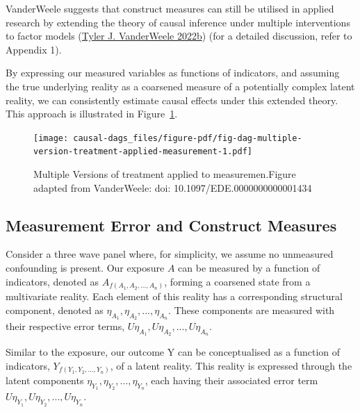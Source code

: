 \documentclass[
  singlecolumn]{report}
\begin{document}
VanderWeele suggests that construct measures can still be utilised in
applied research by extending the theory of causal inference under
multiple interventions to factor models
(\protect\hyperlink{ref-vanderweele2022a}{Tyler J. VanderWeele 2022b})
(for a detailed discussion, refer to Appendix 1).

By expressing our measured variables as functions of indicators, and
assuming the true underlying reality as a coarsened measure of a
potentially complex latent reality, we can consistently estimate causal
effects under this extended theory. This approach is illustrated in
Figure~\ref{fig-dag-multiple-version-treatment-applied-measurement}.

\begin{figure}

{\centering \texttt{[image: causal-dags\_files/figure-pdf/fig-dag-multiple-version-treatment-applied-measurement-1.pdf]}

}

\caption{\label{fig-dag-multiple-version-treatment-applied-measurement}Multiple
Versions of treatment applied to measuremen.Figure adapted from
VanderWeele: doi: 10.1097/EDE.0000000000001434}

\end{figure}

\hypertarget{measurement-error-and-construct-measures}{%
\subsection{Measurement Error and Construct
Measures}\label{measurement-error-and-construct-measures}}

Consider a three wave panel where, for simplicity, we assume no
unmeasured confounding is present. Our exposure \(A\) can be measured by
a function of indicators, denoted as \(A_{f(A_1, A_2, ..., A_n)}\),
forming a coarsened state from a multivariate reality. Each element of
this reality has a corresponding structural component, denoted as
\(\eta_{A_1}, \eta_{A_2}, ..., \eta_{A_n}\). These components are
measured with their respective error terms,
\(U\eta_{A_1}, U\eta_{A_2}, ..., U\eta_{A_n}\).

Similar to the exposure, our outcome Y can be conceptualised as a
function of indicators, \(Y_{f(Y_1, Y_2, ..., Y_n)}\), of a latent
reality. This reality is expressed through the latent components
\(\eta_{Y_1}, \eta_{Y_2}, ..., \eta_{Y_n}\), each having their
associated error term \(U\eta_{Y_1}, U\eta_{Y_2}, ..., U\eta_{Y_n}\).
\end{document}
